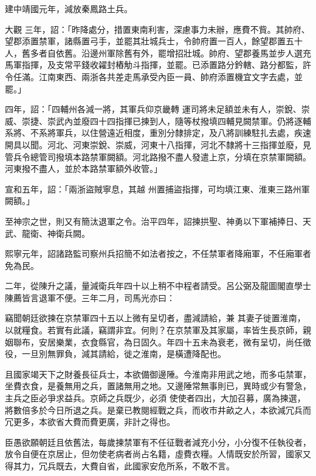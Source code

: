\begin{pinyinscope}
 建中靖國元年，減放秦鳳路土兵。



 大觀
 三年，詔：「昨降處分，措置東南利害，深慮事力未辦，應費不貲。其帥府、望郡添置禁軍，諸縣置弓手，並罷其壯城兵士，令帥府置一百人，餘望郡置五十人，舊多者自依舊。沿邊州軍除舊有外，罷增招壯城。帥府、望郡養馬並步人選充馬軍指揮，及支常平錢收糴封樁觔斗指揮，並罷。已添置路分鈐轄、路分都監，許令任滿。江南東西、兩浙各共差走馬承受內臣一員、帥府添置機宜文字去處，並罷。」



 四年，詔：「四輔州各減一將，其軍兵仰京畿轉
 運司將未足額並未有人，崇銳、崇威、崇捷、崇武內並廢四十四指揮已揀到人，隨等杖撥填四輔見闕禁軍。仍將逐輔系將、不系將軍兵，以住營遠近相度，重別分隸排定，及八將訓練駐扎去處，疾速開具以聞。河北、河東崇銳、崇威，河東十八指揮，河北不隸將十三指揮並廢，見管兵令總管司撥填本路禁軍闕額。河北路撥不盡人發遣上京，分填在京禁軍闕額。河東撥不盡人，並於本路禁軍額外收管。」



 宣和五年，詔：「兩浙盜賊寧息，其越
 州置捕盜指揮，可均填江東、淮東三路州軍闕額。」



 至神宗之世，則又有簡汰退軍之令。治平四年，詔揀拱聖、神勇以下軍補捧日、天武、龍衛、神衛兵闕。



 熙寧元年，詔諸路監司察州兵招簡不如法者按之，不任禁軍者降廂軍，不任廂軍者免為民。



 二年，從陳升之議，量減衛兵年四十以上稍不中程者請受。呂公弼及龍圖閣直學士陳薦皆言退軍不便。三年二月，司馬光亦曰：



 竊聞朝廷欲揀在京禁軍四十五以上微有呈切者，盡減請給，兼
 其妻子徙置淮南，以就糧食。若實有此議，竊謂非宜。何則？在京禁軍及其家屬，率皆生長京師，親姻聯布，安居樂業，衣食縣官，為日固久。年四十五未為衰老，微有呈切，尚任徵役，一旦別無罪負，減其請給，徙之淮南，是橫遭降配也。



 且國家竭天下之財養長征兵士，本欲備御邊陲。今淮南非用武之地，而多屯禁軍，坐費衣食，是養無用之兵，置諸無用之地。又邊陲常無事則已，異時或少有警急，主兵之臣必爭求益兵。京師之兵既少，必須
 使使者四出，大加召募，廣為揀選，將數倍多於今日所退之兵。是棄已教閱經戰之兵，而收市井畝之人，本欲減冗兵而冗更多，本欲省大費而費更廣，非計之得也。



 臣愚欲願朝廷且依舊法，每歲揀禁軍有不任征戰者減充小分，小分復不任執役者，放令自便在京居止，但勿使老病者尚占名籍，虛費衣糧。人情既安於所習，國家又得其力，冗兵既去，大費自省，此國家安危所系，不敢不言。




\end{pinyinscope}
